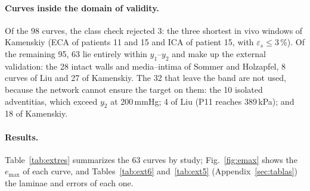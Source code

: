 \paragraph{Curves inside the domain of validity.} Of the 98 curves, the class check rejected 3: the three shortest in vivo windows of Kamenskiy (ECA of patients 11 and 15 and ICA of patient 15, with $\varepsilon_s\le3$\,\%). Of the remaining 95, 63 lie entirely within $y_1$--$y_2$ and make up the external validation: the 28 intact walls and media--intima of Sommer and Holzapfel, 8 curves of Liu and 27 of Kamenskiy. The 32 that leave the band are not used, because the network cannot ensure the target on them: the 10 isolated adventitias, which exceed $y_2$ at 200\,mmHg; 4 of Liu (P11 reaches 389\,kPa); and 18 of Kamenskiy.

\paragraph{Results.} Table~\ref{tab:extres} summarizes the 63 curves by study; Fig.~\ref{fig:emax} shows the $e_{\max}$ of each curve, and Tables~\ref{tab:ext6} and~\ref{tab:ext5} (Appendix~\ref{sec:tablas}) the laminae and errors of each one.

\begin{table}[H]\centering\small
\caption{External validation: the 63 curves inside $y_1$--$y_2$. Curves meeting the 3\,\% target with integer laminae and worst $e_{\max}$ [\%] of each method.}\label{tab:extres}
\end{table}

